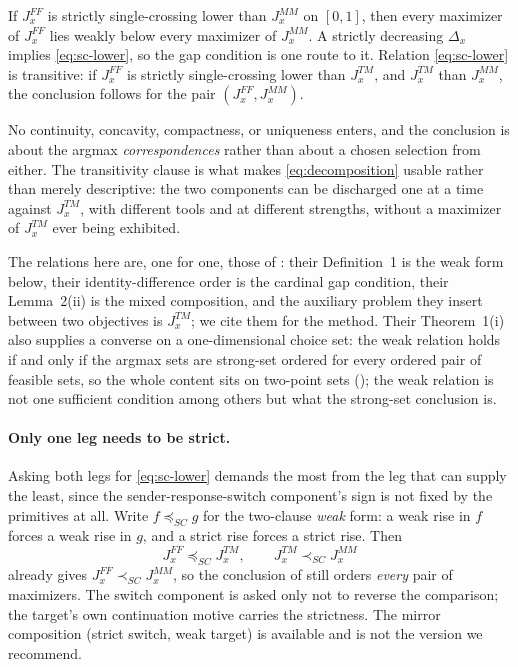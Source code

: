 \begin{proposition}
\label{prop:ordinal-ordering}
If $J^{FF}_x$ is strictly single-crossing lower than $J^{MM}_x$ on $[0,1]$, then
every maximizer of $J^{FF}_x$ lies weakly below every maximizer of $J^{MM}_x$. A
strictly decreasing $\Delta_x$ implies \eqref{eq:sc-lower}, so the gap
condition is one route to it. Relation \eqref{eq:sc-lower} is transitive:
if $J^{FF}_x$ is strictly single-crossing lower than $J^{TM}_x$, and $J^{TM}_x$
than $J^{MM}_x$, the conclusion follows for the pair $(J^{FF}_x,J^{MM}_x)$.
\end{proposition}

No continuity, concavity, compactness, or uniqueness enters, and the conclusion
is about the argmax \emph{correspondences} rather than about a chosen selection
from either. The transitivity clause is what makes \eqref{eq:decomposition}
usable rather than merely descriptive: the two components can be discharged one at
a time against $J^{TM}_x$, with different tools and at different strengths,
without a maximizer of $J^{TM}_x$ ever being exhibited.

The relations here are, one for one, those of \citet{AmirRietzke2025}: their
Definition~1 is the weak form below, their identity-difference order is the
cardinal gap condition, their Lemma~2(ii) is the mixed composition, and the
auxiliary problem they insert between two objectives is $J^{TM}_x$; we cite
them for the method. Their Theorem~1(i) also supplies a converse on a
one-dimensional choice set: the weak relation holds if and only if the argmax
sets are strong-set ordered for every ordered pair of feasible sets, so the
whole content sits on two-point sets
(); the weak relation is not one
sufficient condition among others but what the strong-set conclusion is.

\paragraph{Only one leg needs to be strict.}
Asking both legs for \eqref{eq:sc-lower} demands the most from the leg that can
supply the least, since the sender-response-switch component's sign is not fixed by
the primitives at all. Write $f\preceq_{SC}g$ for the two-clause \emph{weak}
form: a weak rise in $f$ forces a weak rise in $g$, and a strict rise forces a
strict rise. Then
\[
J^{FF}_x\preceq_{SC}J^{TM}_x,
\qquad
J^{TM}_x\prec_{SC}J^{MM}_x
\]
already gives $J^{FF}_x\prec_{SC}J^{MM}_x$, so the conclusion of
 still orders \emph{every} pair of maximizers. The
switch component is asked only not to reverse the comparison; the target's own
continuation motive carries the strictness. The mirror composition (strict
switch, weak target) is available and is not the version we recommend.

